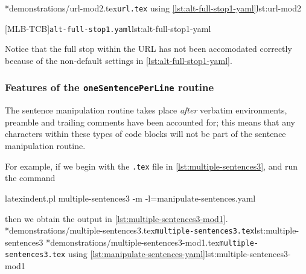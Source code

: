 	\begin{adjustwidth}{-3.5cm}{-1.5cm}
		\begin{minipage}{.6\linewidth}
			\cmhlistingsfromfile*[showspaces=false]*{demonstrations/url-mod2.tex}{\texttt{url.tex} using \cref{lst:alt-full-stop1-yaml}}{lst:url-mod2}
		\end{minipage}
		\hfill
		\begin{minipage}{.4\linewidth}
			{\texttt{alt-full-stop1.yaml}}{lst:alt-full-stop1-yaml}
		\end{minipage}
	\end{adjustwidth}

    Notice that the full stop within the URL has not been accomodated correctly because of the non-default settings in \cref{lst:alt-full-stop1-yaml}.

\subsubsection{Features of the \texttt{oneSentencePerLine} routine}
	The sentence manipulation routine takes place \emph{after} verbatim environments, preamble and trailing comments have
	been accounted for; this means that any characters within these types of code blocks will not be part
	of the sentence manipulation routine.

	For example, if we begin with the \texttt{.tex} file in \cref{lst:multiple-sentences3}, and run the command
	\begin{commandshell}
latexindent.pl multiple-sentences3 -m -l=manipulate-sentences.yaml
	\end{commandshell}
	then we obtain the output in \cref{lst:multiple-sentences3-mod1}.
	\cmhlistingsfromfile*[showspaces=false]*{demonstrations/multiple-sentences3.tex}{\texttt{multiple-sentences3.tex}}{lst:multiple-sentences3}
	\cmhlistingsfromfile*[showspaces=false]*{demonstrations/multiple-sentences3-mod1.tex}{\texttt{multiple-sentences3.tex} using \vref{lst:manipulate-sentences-yaml}}{lst:multiple-sentences3-mod1}

